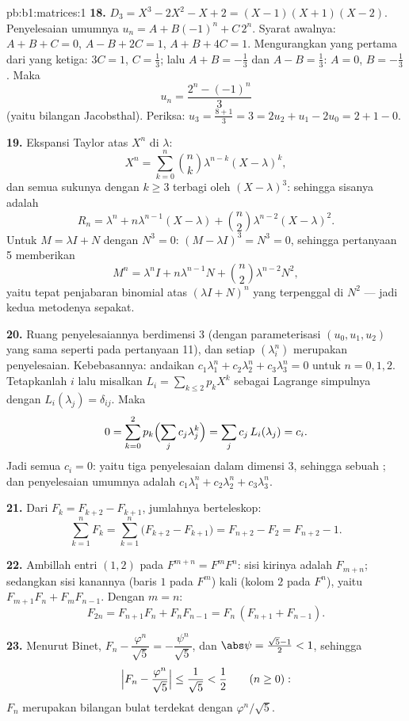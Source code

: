\begin{solution}{pb:b1:matrices:1}
\textbf{18.} $D_3 = X^3 - 2X^2 - X + 2 = (X-1)(X+1)(X-2)$.
Penyelesaian umumnya $u_n = A + B(-1)^n + C\,2^n$. Syarat
awalnya: $A + B + C = 0$, $A - B + 2C = 1$, $A + B + 4C = 1$.
Mengurangkan yang pertama dari yang ketiga: $3C = 1$, $C = \frac13$;
lalu $A + B = -\frac13$ dan $A - B = \frac13$: $A = 0$, $B =
-\frac13$. Maka
\[
u_n = \frac{2^n - (-1)^n}{3}
\]
(yaitu bilangan Jacobsthal). Periksa: $u_3 = \frac{8 + 1}{3} = 3 =
2u_2 + u_1 - 2u_0 = 2 + 1 - 0$.

\textbf{19.} Ekspansi Taylor atas  $X^n$ di
$\lambda$:
\[
X^n = \sum_{k=0}^{n} \binom nk \lambda^{n-k}(X - \lambda)^k ,
\]
dan semua sukunya dengan $k \geq 3$ terbagi oleh $(X -
\lambda)^3$: sehingga sisanya adalah
\[
R_n = \lambda^n + n\lambda^{n-1}(X - \lambda) + \binom
n2\lambda^{n-2}(X - \lambda)^2 .
\]
Untuk $M = \lambda I + N$ dengan $N^3 = 0$: $(M - \lambda I)^3 = N^3
= 0$, sehingga pertanyaan 5 memberikan
\[
M^n = \lambda^n I + n\lambda^{n-1} N + \binom n2
\lambda^{n-2} N^2 ,
\]
yaitu tepat penjabaran binomial atas $(\lambda I + N)^n$
yang terpenggal di $N^2$ --- jadi kedua metodenya sepakat.

\textbf{20.} Ruang penyelesaiannya berdimensi $3$ (dengan
parameterisasi $(u_0, u_1, u_2)$ yang sama seperti pada pertanyaan 11), dan
setiap $(\lambda_i^n)$ merupakan penyelesaian. Kebebasannya: andaikan
$c_1\lambda_1^n + c_2\lambda_2^n + c_3\lambda_3^n = 0$ untuk $n =
0, 1, 2$. Tetapkanlah $i$ lalu misalkan $L_i = \sum_{k \leq 2} p_k X^k$ sebagai
 Lagrange simpulnya dengan $L_i(\lambda_j) =
\delta_{ij}$. Maka
\[
0 = \sum_{k=0}^{2} p_k\Bigl(\sum_j c_j\lambda_j^k\Bigr)
= \sum_j c_j\,L_i(\lambda_j) = c_i .
\]
Jadi semua $c_i = 0$: yaitu tiga penyelesaian  dalam dimensi $3$, sehingga sebuah
; dan penyelesaian umumnya adalah $c_1\lambda_1^n +
c_2\lambda_2^n + c_3\lambda_3^n$.

\textbf{21.} Dari $F_k = F_{k+2} - F_{k+1}$, jumlahnya berteleskop:
\[
\sum_{k=1}^{n} F_k = \sum_{k=1}^{n}\bigl(F_{k+2} - F_{k+1}\bigr)
= F_{n+2} - F_2 = F_{n+2} - 1 .
\]

\textbf{22.} Ambillah entri $(1,2)$ pada $F^{m+n} = F^m F^n$: sisi
kirinya adalah $F_{m+n}$; sedangkan sisi kanannya (baris $1$ pada $F^m$)
kali (kolom $2$ pada $F^n$), yaitu $F_{m+1}F_n + F_m F_{n-1}$.
Dengan $m = n$:
\[
F_{2n} = F_{n+1}F_n + F_nF_{n-1} = F_n\,(F_{n+1} + F_{n-1}).
\]

\textbf{23.} Menurut Binet, $F_n - \dfrac{\varphi^n}{\sqrt5} =
-\dfrac{\psi^n}{\sqrt5}$, dan $\abs\psi = \frac{\sqrt5 - 1}2 <
1$, sehingga
\[
\Bigl|F_n - \frac{\varphi^n}{\sqrt5}\Bigr|
\leq \frac{1}{\sqrt5} < \frac12
\qquad (n \geq 0):
\]
$F_n$ merupakan bilangan bulat terdekat dengan $\varphi^n/\sqrt5$.


\end{solution}
